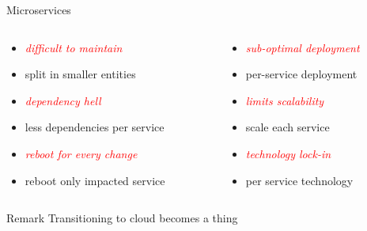 \documentclass{beamer}
\begin{document}
\begin{frame}{Microservices}
    \begin{columns}
        \begin{column}{0.53\textwidth}
            \begin{itemize}
                \item \emph{\textcolor{red}{difficult to maintain}}
                \item split in smaller entities 
                \item \emph{\textcolor{red}{dependency hell}}
                \item less dependencies per service
                \item \emph{\textcolor{red}{reboot for every change}}
                \item reboot only impacted service
            \end{itemize}
        \end{column}
        \begin{column}{0.5\textwidth}
            \begin{itemize}
                \item \emph{\textcolor{red}{sub-optimal deployment}}
                \item per-service deployment
                \item \emph{\textcolor{red}{limits scalability}}
                \item scale each service
                \item \emph{\textcolor{red}{technology lock-in}}
                \item per service technology
            \end{itemize}
        \end{column}
    \end{columns}
    \vspace{1cm}
    \begin{alertblock}{Remark}
        Transitioning to cloud becomes a thing
    \end{alertblock}
\end{frame}
\end{document}

